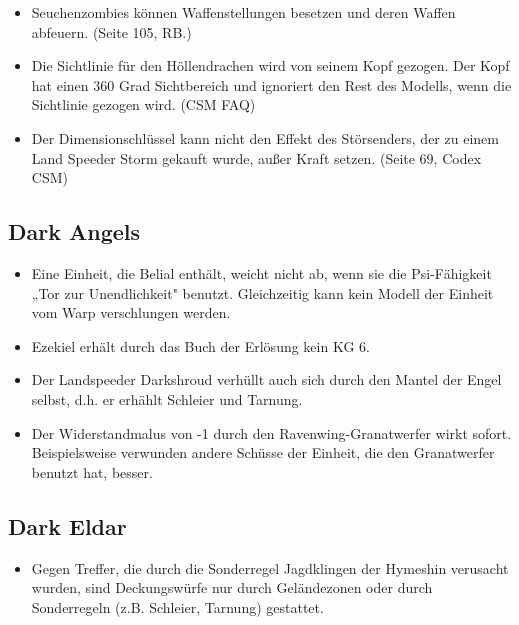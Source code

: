 \begin{itemize}
 \item Seuchenzombies können Waffenstellungen besetzen und deren Waffen
  abfeuern.  (Seite 105, RB.)

 \item Die Sichtlinie für den Höllendrachen wird von seinem Kopf gezogen. Der
  Kopf hat einen 360 Grad Sichtbereich und ignoriert den Rest des Modells, wenn
  die Sichtlinie gezogen wird. (CSM FAQ)

 \item Der Dimensionschlüssel kann nicht den Effekt des Störsenders, der zu
  einem Land Speeder Storm gekauft wurde, außer Kraft setzen. (Seite 69, Codex
  CSM) 

\end{itemize}

\subsection{Dark Angels}

\begin{itemize}

 \item Eine Einheit, die Belial enthält, weicht nicht ab, wenn sie die
  Psi-Fähigkeit „Tor zur Unendlichkeit" benutzt. Gleichzeitig kann kein Modell
  der Einheit vom Warp verschlungen werden.

 \item Ezekiel erhält durch das Buch der Erlösung kein KG 6.

 \item Der Landspeeder Darkshroud verhüllt auch sich durch den Mantel der Engel
  selbst, d.h. er erhählt Schleier und Tarnung.

 \item Der Widerstandmalus von -1 durch den Ravenwing-Granatwerfer wirkt sofort.
  Beispielsweise verwunden andere Schüsse der Einheit, die den Granatwerfer
  benutzt hat, besser.

\end{itemize}

\subsection{Dark Eldar}

\begin{itemize}

 \item Gegen Treffer, die durch die Sonderregel Jagdklingen der Hymeshin
  verusacht wurden, sind Deckungswürfe nur durch Geländezonen oder durch
  Sonderregeln (z.B.  Schleier, Tarnung) gestattet.

\end{itemize}

